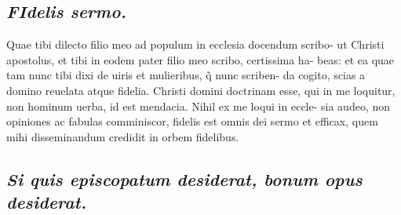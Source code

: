 \documentclass{article}
\begin{document}
\begin{pages}
\subsection*{\textit{\huge\textbf{F}\normalsize Idelis sermo. }}\pstart Quae tibi dilecto filio meo ad populum in ecclesia docendum scribo- ut Christi apostolus, et tibi in eodem pater filio meo scribo, certissima ha- beas: et ea quae tam nunc tibi dixi de uiris et mulieribus, q̃ nunc scriben- da cogito, scias a domino reuelata atque fidelia. Christi domini doctrinam esse, qui in me loquitur, non hominum uerba, id est mendacia. Nihil ex me loqui in eccle- sia audeo, non opiniones ac fabulas comminiscor, fidelis est omnis dei sermo et efficax, quem mihi disseminandum credidit in orbem fidelibus.  \pend
{}
{}
\subsection*{\textit{Si quis episcopatum desiderat, bonum opus desiderat. }}

\end{pages}
\end{document}
